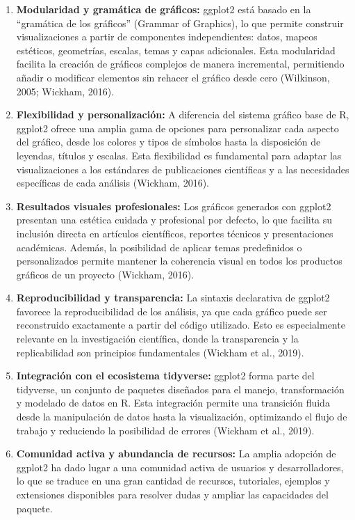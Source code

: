 \documentclass[
  spanish,
  a4paper,
  DIV=11,
  numbers=noendperiod,
  onepage,
  openany]{scrreprt}
\begin{document}
\begin{enumerate}
\def\labelenumi{\arabic{enumi}.}
\item
  \textbf{Modularidad y gramática de gráficos:} ggplot2 está basado en
  la ``gramática de los gráficos'' (Grammar of Graphics), lo que permite
  construir visualizaciones a partir de componentes independientes:
  datos, mapeos estéticos, geometrías, escalas, temas y capas
  adicionales. Esta modularidad facilita la creación de gráficos
  complejos de manera incremental, permitiendo añadir o modificar
  elementos sin rehacer el gráfico desde cero (Wilkinson, 2005; Wickham,
  2016).
\item
  \textbf{Flexibilidad y personalización:} A diferencia del sistema
  gráfico base de R, ggplot2 ofrece una amplia gama de opciones para
  personalizar cada aspecto del gráfico, desde los colores y tipos de
  símbolos hasta la disposición de leyendas, títulos y escalas. Esta
  flexibilidad es fundamental para adaptar las visualizaciones a los
  estándares de publicaciones científicas y a las necesidades
  específicas de cada análisis (Wickham, 2016).
\item
  \textbf{Resultados visuales profesionales:} Los gráficos generados con
  ggplot2 presentan una estética cuidada y profesional por defecto, lo
  que facilita su inclusión directa en artículos científicos, reportes
  técnicos y presentaciones académicas. Además, la posibilidad de
  aplicar temas predefinidos o personalizados permite mantener la
  coherencia visual en todos los productos gráficos de un proyecto
  (Wickham, 2016).
\item
  \textbf{Reproducibilidad y transparencia:} La sintaxis declarativa de
  ggplot2 favorece la reproducibilidad de los análisis, ya que cada
  gráfico puede ser reconstruido exactamente a partir del código
  utilizado. Esto es especialmente relevante en la investigación
  científica, donde la transparencia y la replicabilidad son principios
  fundamentales (Wickham et al., 2019).
\item
  \textbf{Integración con el ecosistema tidyverse:} ggplot2 forma parte
  del tidyverse, un conjunto de paquetes diseñados para el manejo,
  transformación y modelado de datos en R. Esta integración permite una
  transición fluida desde la manipulación de datos hasta la
  visualización, optimizando el flujo de trabajo y reduciendo la
  posibilidad de errores (Wickham et al., 2019).
\item
  \textbf{Comunidad activa y abundancia de recursos:} La amplia adopción
  de ggplot2 ha dado lugar a una comunidad activa de usuarios y
  desarrolladores, lo que se traduce en una gran cantidad de recursos,
  tutoriales, ejemplos y extensiones disponibles para resolver dudas y
  ampliar las capacidades del paquete.
\end{enumerate}
\end{document}

